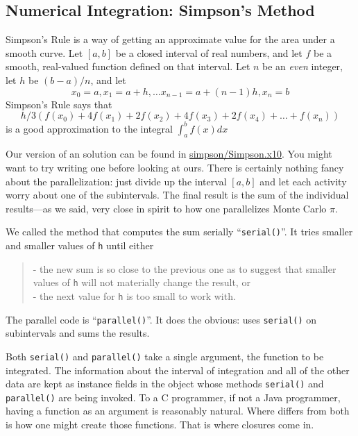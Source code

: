 \subsection{ Numerical Integration: Simpson's Method}
Simpson's Rule is a way of getting an approximate value for the area
under a smooth curve.
Let $[a, b]$ be a closed interval of real numbers, and let 
$f$ be a smooth, real-valued function defined on that interval.
Let $n$ be an \emph{even} integer, let $h$ be $(b-a)/n$, and let
$$x_{0}=a, x_{1}=a+h, \dots x_{n-1} = a + (n-1)h, x_{n} = b$$
Simpson's Rule says that
$$
h/3 (f(x_{0}) + 4f(x_{1}) + 2f(x_{2}) + 4f(x_{3}) + 2f(x_{4}) + \dots + f(x_{n}))
$$
is a good approximation to the integral
$
\int_a^b f(x)dx
$

Our version of an \Xten{} solution can be found in 
\href{http://dist.codehaus.org/x10/documentation/guide/src/simpon/Simpson.x10}{simpson/Simpson.x10}.
You might want to try writing one before looking at ours.  There is certainly
nothing fancy about the parallelization: just divide up the interval $[a, b]$
and let each activity worry about one of the subintervals.  The final result is 
the sum of the individual results---as we said, very close in spirit to how one
parallelizes Monte Carlo $\pi$.
 
We called the method that computes the sum serially
``{\tt serial()}''.  It tries smaller and smaller values of {\tt h}
until either 
\begin{quote}
- the new sum is so close to the previous one as to suggest that
smaller\\
\hspace*{2em} values of {\tt h} will not materially change the result, or\\
- the next value for {\tt h} is too small to work with.
\end{quote}   

The parallel code is ``{\tt parallel()}''. It does the obvious: uses {\tt serial()}
on subintervals and sums the results.

Both {\tt serial()} and {\tt parallel()} take a single argument, the function to be
integrated.  The information about the interval of integration and all of
the other data are kept as instance fields in the object whose methods 
{\tt serial()} and {\tt parallel()} are being invoked.  To a C programmer, if not a Java
programmer, having a function as an argument is reasonably natural.  Where
\Xten differs from both is how one might create those functions.  That is
where closures come in. 

